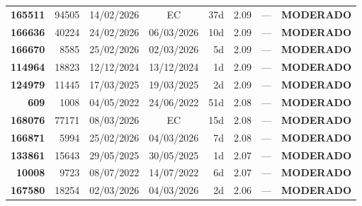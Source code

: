 \documentclass[a4paper,10pt]{article}
\begin{document}
\begin{center}
\begin{longtable}{>{\scriptsize}r>{\scriptsize}r>{\scriptsize}c>{\scriptsize}c>{\scriptsize}r>{\scriptsize}r>{\scriptsize}r>{\scriptsize}l}
\textcolor{anomyellow}{\textbf{165511}} & 94505 & 14/02/2026 & \textcolor{anomorange}{EC} & 37d & \textcolor{anomyellow}{2.09} & --- & \textcolor{anomyellow}{\textbf{MODERADO}} \\

\textcolor{anomyellow}{\textbf{166636}} & 40224 & 24/02/2026 & 06/03/2026 & 10d & \textcolor{anomyellow}{2.09} & --- & \textcolor{anomyellow}{\textbf{MODERADO}} \\

\textcolor{anomyellow}{\textbf{166670}} & 8585 & 25/02/2026 & 02/03/2026 & 5d & \textcolor{anomyellow}{2.09} & --- & \textcolor{anomyellow}{\textbf{MODERADO}} \\

\textcolor{anomyellow}{\textbf{114964}} & 18823 & 12/12/2024 & 13/12/2024 & 1d & \textcolor{anomyellow}{2.09} & --- & \textcolor{anomyellow}{\textbf{MODERADO}} \\

\textcolor{anomyellow}{\textbf{124979}} & 11445 & 17/03/2025 & 19/03/2025 & 2d & \textcolor{anomyellow}{2.09} & --- & \textcolor{anomyellow}{\textbf{MODERADO}} \\

\textcolor{anomyellow}{\textbf{609}} & 1008 & 04/05/2022 & 24/06/2022 & 51d & \textcolor{anomyellow}{2.08} & --- & \textcolor{anomyellow}{\textbf{MODERADO}} \\

\textcolor{anomyellow}{\textbf{168076}} & 77171 & 08/03/2026 & \textcolor{anomorange}{EC} & 15d & \textcolor{anomyellow}{2.08} & --- & \textcolor{anomyellow}{\textbf{MODERADO}} \\

\textcolor{anomyellow}{\textbf{166871}} & 5994 & 25/02/2026 & 04/03/2026 & 7d & \textcolor{anomyellow}{2.08} & --- & \textcolor{anomyellow}{\textbf{MODERADO}} \\

\textcolor{anomyellow}{\textbf{133861}} & 15643 & 29/05/2025 & 30/05/2025 & 1d & \textcolor{anomyellow}{2.07} & --- & \textcolor{anomyellow}{\textbf{MODERADO}} \\

\textcolor{anomyellow}{\textbf{10008}} & 9723 & 08/07/2022 & 14/07/2022 & 6d & \textcolor{anomyellow}{2.07} & --- & \textcolor{anomyellow}{\textbf{MODERADO}} \\

\textcolor{anomyellow}{\textbf{167580}} & 18254 & 02/03/2026 & 04/03/2026 & 2d & \textcolor{anomyellow}{2.06} & --- & \textcolor{anomyellow}{\textbf{MODERADO}} \\


\end{longtable}
\end{center}
\end{document}
